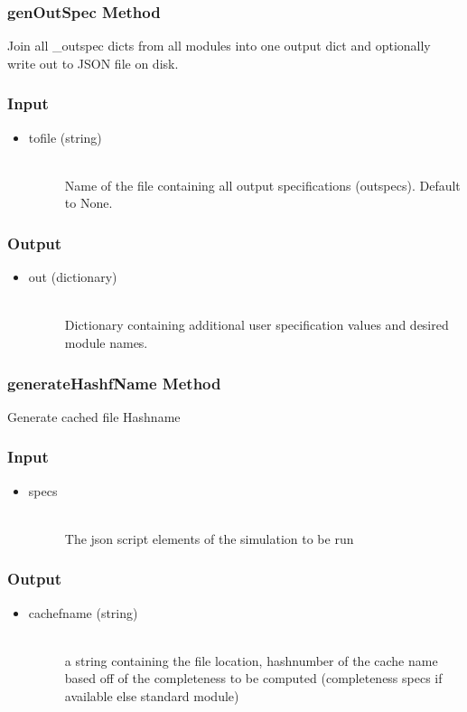 \documentclass[cleanfoot]{asme2ej}
\begin{document}
\subsubsection{genOutSpec Method} \label{sec:genOutSpectask}
Join all \_outspec dicts from all modules into one output dict and optionally write out to JSON file on disk.
\subsubsection*{Input}
\begin{itemize}
\item
\begin{description}
    \item[tofile (string)] \hfill \\ Name of the file containing all output specifications (outspecs). Default to None.
\end{description}
\end{itemize}
\subsubsection*{Output}
\begin{itemize}
\item
\begin{description}
    \item[out (dictionary)] \hfill \\ Dictionary containing additional user specification values and desired module names.
\end{description}
\end{itemize}

\subsubsection{generateHashfName Method} \label{sec:generateHashfNametask}
Generate cached file Hashname
\subsubsection*{Input}
\begin{itemize}
\item
\begin{description}
    \item[specs] \hfill \\ The json script elements of the simulation to be run
\end{description}
\end{itemize}
\subsubsection*{Output}
\begin{itemize}
\item
\begin{description}
    \item[cachefname (string)] \hfill \\ a string containing the file location, hashnumber of the cache name based off of the completeness to be computed (completeness specs if available else standard module)
\end{description}
\end{itemize}
\end{document}
